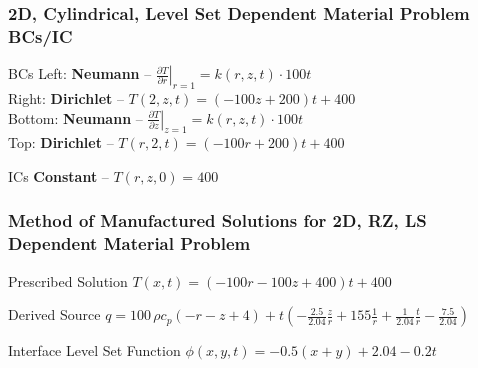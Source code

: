 \documentclass[]{beamer}
\begin{document}
\begin{frame}[t]\frametitle{2D, Cylindrical, Level Set Dependent Material Problem BCs/IC}
  \begin{block}{BCs}
    Left: \textbf{Neumann} -- $\left. \frac{\partial T}{\partial r}\right|_{r=1} = k(r,z,t)\cdot 100t$ \\
    Right: \textbf{Dirichlet} -- $T(2,z,t) = (-100z + 200)t +400$ \\
    Bottom: \textbf{Neumann} -- $\left. \frac{\partial T}{\partial z}\right|_{z=1} = k(r,z,t)\cdot 100t$ \\
    Top: \textbf{Dirichlet} -- $T(r,2,t) = (-100r + 200)t + 400$
  \end{block}
  
  \begin{block}{ICs}
    \textbf{Constant} -- $T(r,z,0) = 400$
  \end{block}
\end{frame}

\begin{frame}[t]\frametitle{Method of Manufactured Solutions for 2D, RZ, LS Dependent Material Problem}
  \begin{block}{Prescribed Solution}
    $T(x,t) = (-100r-100z+400)t + 400$
  \end{block}
  
  \begin{block}{Derived Source}
  $q = 100\,\rho c_p \left(-r-z+4\right)+ t\left(-\frac{2.5}{2.04}\frac{z}{r} + 155\frac{1}{r}
  +\frac{1}{2.04}\frac{t}{r} - \frac{7.5}{2.04}\right)$
  \end{block}
  
  \begin{block}{Interface Level Set Function}
    $\phi(x,y,t) = -0.5(x+y) + 2.04 - 0.2t$
  \end{block}
\end{frame}
\end{document}
